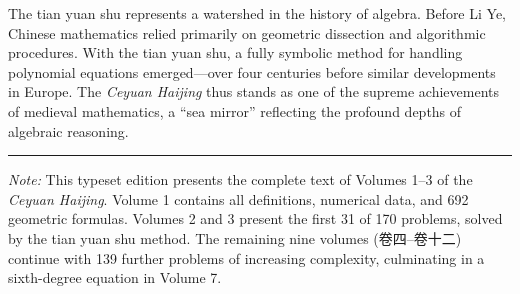 \documentclass[11pt,a4paper]{article}
\begin{document}
\vspace{0.3cm}

The tian yuan shu represents a watershed in the history of algebra. Before Li Ye, Chinese mathematics relied primarily on geometric dissection and algorithmic procedures. With the tian yuan shu, a fully symbolic method for handling polynomial equations emerged---over four centuries before similar developments in Europe. The \textit{Ceyuan Haijing} thus stands as one of the supreme achievements of medieval mathematics, a ``sea mirror'' reflecting the profound depths of algebraic reasoning.

\vspace{0.5cm}
\noindent\textcolor{rulecolor}{\rule{\textwidth}{0.4pt}}

\vspace{0.5cm}

\noindent\textit{Note:} This typeset edition presents the complete text of Volumes 1--3 of the \textit{Ceyuan Haijing}. Volume 1 contains all definitions, numerical data, and 692 geometric formulas. Volumes 2 and 3 present the first 31 of 170 problems, solved by the tian yuan shu method. The remaining nine volumes (卷四--卷十二) continue with 139 further problems of increasing complexity, culminating in a sixth-degree equation in Volume 7.
\end{document}

